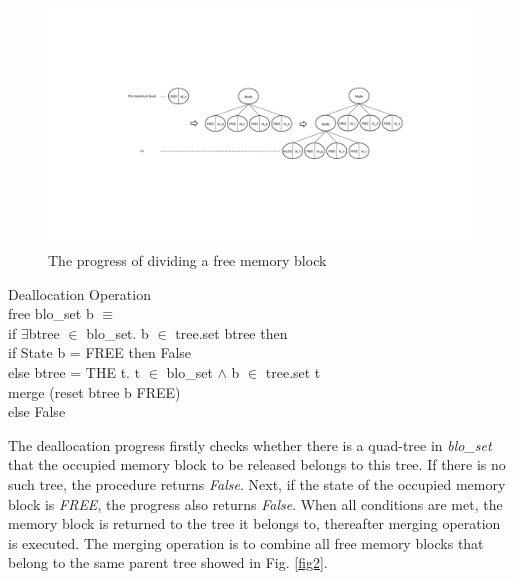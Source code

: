 \documentclass[runningheads]{llncs}
\begin{document}
\begin{figure}
\centering
\includegraphics[width=1\textwidth]{fig1.pdf}
\caption{The progress of dividing a free memory block}
\label{fig1}
\end{figure}

\begin{definition} {Deallocation Operation} \\
free blo\_set b $\equiv$ \\
\phantom{x} \hspace{10pt} if $\exists$btree $\in$ blo\_set. b $\in$ tree.set btree then \\
\phantom{x} \hspace{20pt} if State b = FREE then False \\
\phantom{x} \hspace{20pt} else btree = THE t. t $\in$ blo\_set $\wedge$ b $\in$ tree.set t \\
\phantom{x} \hspace{40pt} merge (reset btree b FREE) \\
\phantom{x} \hspace{10pt} else False
\end{definition}

The deallocation progress firstly checks whether there is a quad-tree in \textsl{blo\_set} that the occupied memory block to be released belongs to this tree. If there is no such tree, the procedure returns \textsl{False}. Next, if the state of the occupied memory block is \textsl{FREE}, the progress also returns \textsl{False}. When all conditions are met, the memory block is returned to the tree it belongs to, thereafter merging operation is executed. The merging operation is to combine all free memory blocks that belong to the same parent tree showed in Fig. \ref{fig2}.
\end{document}
